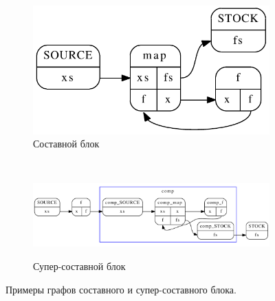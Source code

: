 \documentclass[10pt,a4paper]{article}
\begin{document}
\begin{figure}[H]
  \centering
  
  \begin{subfigure}[b]{0.3\textwidth}
    \centering
    \label{example:composite}
    \includegraphics[width=\textwidth]{example_cg.pdf}
    \caption{Составной блок}
  \end{subfigure}
  ~
  \begin{subfigure}[b]{1.0\textwidth}
    \centering
    \includegraphics[width=\textwidth]{cc_cg.pdf}
    \label{example:supercomposite}
    \caption{Супер-составной блок}
  \end{subfigure}
  
  \caption{ Примеры графов составного и супер-составного блока.}
  \label{example}
\end{figure}
\end{document}
